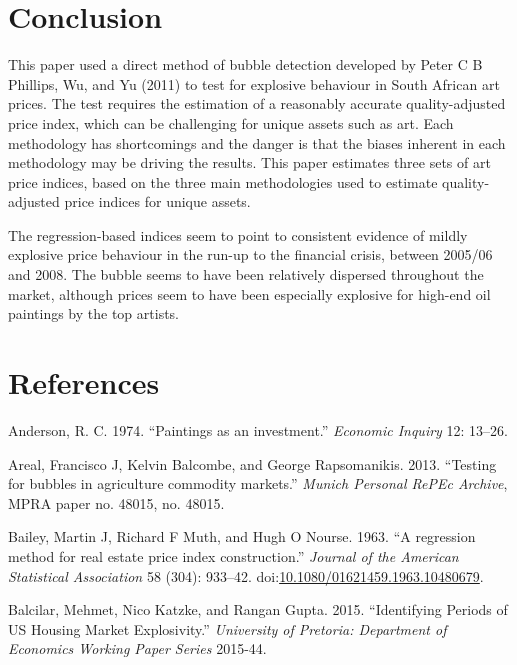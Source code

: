 \documentclass[]{elsarticle} %
\begin{document}
\section{Conclusion}\label{conclusion}

This paper used a direct method of bubble detection developed by Peter C
B Phillips, Wu, and Yu (2011) to test for explosive behaviour in South
African art prices. The test requires the estimation of a reasonably
accurate quality-adjusted price index, which can be challenging for
unique assets such as art. Each methodology has shortcomings and the
danger is that the biases inherent in each methodology may be driving
the results. This paper estimates three sets of art price indices, based
on the three main methodologies used to estimate quality-adjusted price
indices for unique assets.

The regression-based indices seem to point to consistent evidence of
mildly explosive price behaviour in the run-up to the financial crisis,
between 2005/06 and 2008. The bubble seems to have been relatively
dispersed throughout the market, although prices seem to have been
especially explosive for high-end oil paintings by the top artists.

\section*{References}\label{references}

\hypertarget{refs}{}
\hypertarget{ref-Anderson1974}{}
Anderson, R. C. 1974. ``Paintings as an investment.'' \emph{Economic
Inquiry} 12: 13--26.

\hypertarget{ref-Areal2013}{}
Areal, Francisco J, Kelvin Balcombe, and George Rapsomanikis. 2013.
``Testing for bubbles in agriculture commodity markets.'' \emph{Munich
Personal RePEc Archive}, MPRA paper no. 48015, no. 48015.

\hypertarget{ref-Bailey1963a}{}
Bailey, Martin J, Richard F Muth, and Hugh O Nourse. 1963. ``A
regression method for real estate price index construction.''
\emph{Journal of the American Statistical Association} 58 (304):
933--42.
doi:\href{https://doi.org/10.1080/01621459.1963.10480679}{10.1080/01621459.1963.10480679}.

\hypertarget{ref-Balcilar2015}{}
Balcilar, Mehmet, Nico Katzke, and Rangan Gupta. 2015. ``Identifying
Periods of US Housing Market Explosivity.'' \emph{University of
Pretoria: Department of Economics Working Paper Series} 2015-44.
\end{document}
